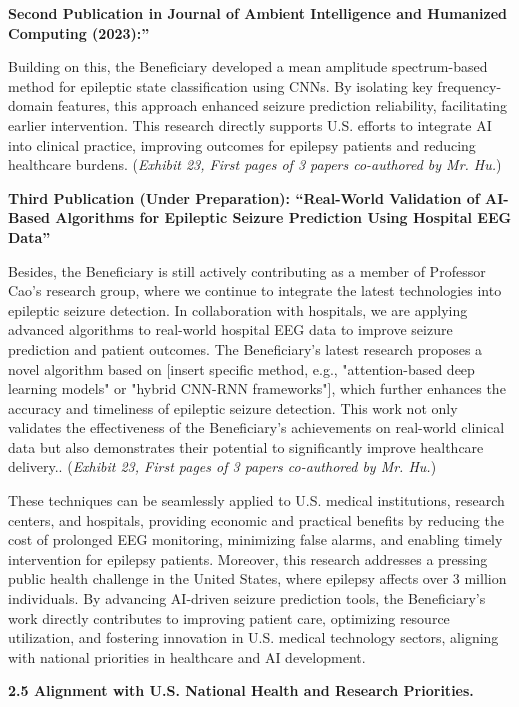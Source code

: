 \documentclass{article}
\begin{document}
{\bf Second Publication in Journal of Ambient Intelligence and Humanized Computing (2023):”}

Building on this, the Beneficiary developed a mean amplitude spectrum-based method for epileptic state classification using CNNs. By isolating key frequency-domain features, this approach enhanced seizure prediction reliability, facilitating earlier intervention. This research directly supports U.S. efforts to integrate AI into clinical practice, improving outcomes for epilepsy patients and reducing healthcare burdens. ({\it Exhibit 23, First pages of 3 papers co-authored by Mr. Hu.}) 

{\bf Third Publication (Under Preparation): “Real-World Validation of AI-Based Algorithms for Epileptic Seizure Prediction Using Hospital EEG Data”}

Besides, the Beneficiary is still actively contributing as a member of Professor Cao's research group, where we continue to integrate the latest technologies into epileptic seizure detection. In collaboration with hospitals, we are applying advanced algorithms to real-world hospital EEG data to improve seizure prediction and patient outcomes. The Beneficiary's latest research proposes a novel algorithm based on [insert specific method, e.g., "attention-based deep learning models" or "hybrid CNN-RNN frameworks"], which further enhances the accuracy and timeliness of epileptic seizure detection. This work not only validates the effectiveness of the Beneficiary’s achievements on real-world clinical data but also demonstrates their potential to significantly improve healthcare delivery.. ({\it Exhibit 23, First pages of 3 papers co-authored by Mr. Hu.}) 

These techniques can be seamlessly applied to U.S. medical institutions, research centers, and hospitals, providing economic and practical benefits by reducing the cost of prolonged EEG monitoring, minimizing false alarms, and enabling timely intervention for epilepsy patients. Moreover, this research addresses a pressing public health challenge in the United States, where epilepsy affects over 3 million individuals. By advancing AI-driven seizure prediction tools, the Beneficiary’s work directly contributes to improving patient care, optimizing resource utilization, and fostering innovation in U.S. medical technology sectors, aligning with national priorities in healthcare and AI development.

{\bf 2.5 Alignment with U.S. National Health and Research Priorities. }
\end{document}
